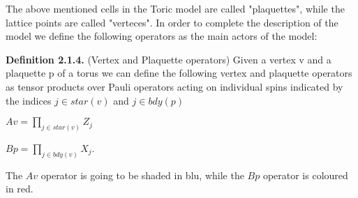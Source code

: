 \documentclass[12pt]{report}
\begin{document}
	
	\begin{minipage}{1\textwidth}
		
		The above mentioned cells in the Toric model are called "plaquettes", while the lattice points are called "verteces".
		In order to complete the description of the model we define the following operators as the main actors of the model:\newline
		
		\textbf{Definition 2.1.4.} (Vertex and Plaquette operators) Given a vertex v and a plaquette p of a torus we can define the following vertex and plaquette operators as tensor products over Pauli operators acting on individual spins indicated by the indices $j \in star(v)$ and $j \in bdy(p)$  \newline 
		
		\begin{center}
			$ Av = \prod_{j \in star(v)} Z_j $ \newline
			
			$ Bp = \prod_{j \in bdy(v)} X_j $.\newline
		\end{center}
		
		The $Av$ operator is going to be shaded in blu, while the $Bp$ operator is coloured in red. \newline
		
		\begin{center}
\end{center}
\end{minipage}
\end{document}
